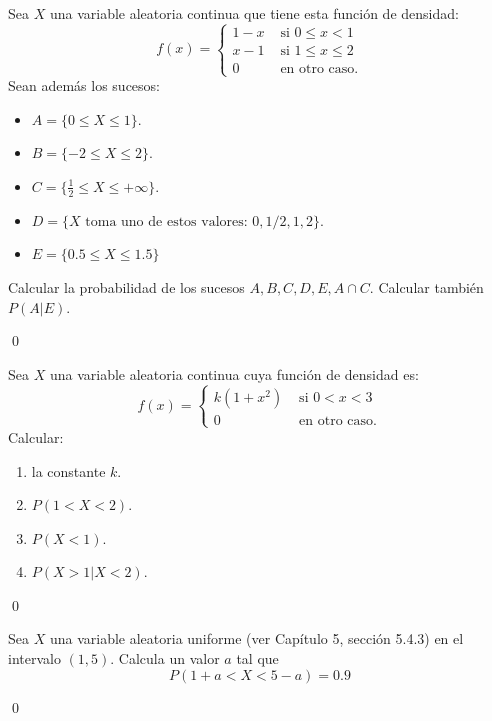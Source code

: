 \documentclass[10pt,a4paper]{article}\usepackage[]{graphicx}\usepackage[]{color}
\newcounter{cont01}
\begin{document}
\begin{ejercicio}
\label{tut05:ejercicio37}
Sea $X$ una variable aleatoria continua que tiene esta función de densidad:
    \[
    f(x)=
    \begin{cases}
    1-x&\mbox{ si }0\leq x<1\\
    x-1&\mbox{ si }1\leq x\leq 2\\
    0&\mbox{ en otro caso.}
    \end{cases}
    \]
    Sean además los sucesos:
    \begin{itemize}
    \item[] $A=\{0\leq X\leq 1\}$.
    \item[] $B=\{-2\leq X\leq 2\}$.
    \item[] $C=\{\frac{1}{2}\leq X\leq +\infty\}$.
    \item[] $D=\{X\mbox{ toma uno de estos valores: }0,1/2, 1, 2 \}$.
    \item[] $E=\{0.5\leq X\leq 1.5\}$
    \end{itemize}
Calcular la probabilidad de los sucesos $A, B, C, D, E, A\cap C$. Calcular también $P(A|E)$.

\qed\end{ejercicio}
\begin{ejercicio}
\label{tut05:ejercicio38}
Sea $X$ una variable aleatoria continua cuya función de densidad es:
    \[
    f(x)=
    \begin{cases}
    k(1+x^2)&\mbox{ si }0<x<3\\
    0&\mbox{ en otro caso.}
    \end{cases}
    \]
    Calcular:
    \begin{enumerate}
    \item la constante $k$.
    \item $P(1<X<2)$.
    \item $P(X<1)$.
    \item $P(X>1|X<2)$.
    \end{enumerate}

\qed\end{ejercicio}
\begin{ejercicio}
\label{tut05:ejercicio39}
Sea $X$ una variable aleatoria uniforme (ver Capítulo 5, sección 5.4.3) en el intervalo 					$(1,5)$. Calcula un valor $a$ tal que
			\[P(1+a < X < 5-a)=0.9\]

\qed\end{ejercicio}
\end{document}
